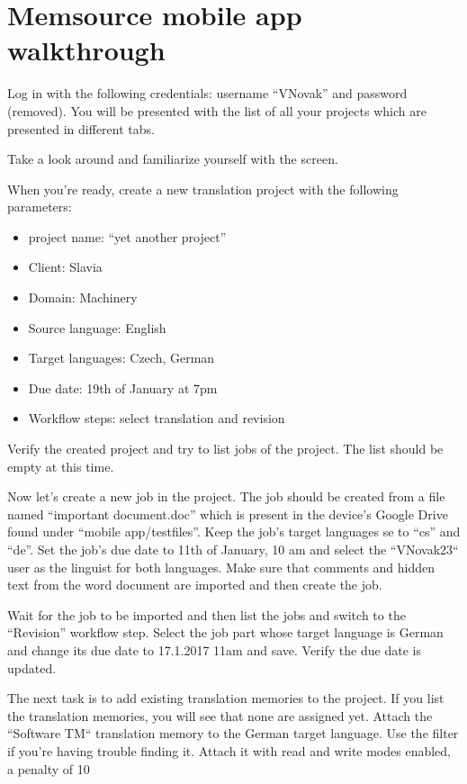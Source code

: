 \chapter{Memsource mobile app walkthrough}

Log in with the following credentials: username “VNovak” and password (removed). You will be presented with the list of all your projects which are presented in different tabs.

Take a look around and familiarize yourself with the screen.

When you’re ready, create a new translation project with the following parameters: 

\begin{itemize}
\item project name: “yet another project”
\item Client: Slavia
\item Domain: Machinery
\item Source language: English 
\item Target languages: Czech, German
\item Due date: 19th of January at 7pm
\item Workflow steps: select translation and revision
\end{itemize}




Verify the created project and try to list jobs of the project. The list should be empty at this time. 

Now let’s create a new job in the project. The job should be created from a file named “important document.doc” which is present in the device's Google Drive found under “mobile app/testfiles”. 
Keep the job’s target languages se to “cs” and “de”.
Set the job’s due date to 11th of January, 10 am and select the “VNovak23“ user as the linguist for both languages. 
Make sure that comments and hidden text from the word document are imported and then create the job. 

Wait for the job to be imported and then list the jobs and switch to the “Revision” workflow step. Select the job part whose target language is German and change its due date to 17.1.2017 11am and save. Verify the due date is updated.

The next task is to add existing translation memories to the project. If you list the translation memories, you will see that none are assigned yet.  Attach the “Software TM“ translation memory to the German target language. Use the filter if you’re having trouble finding it. Attach it with read and write modes enabled, a penalty of 10%

